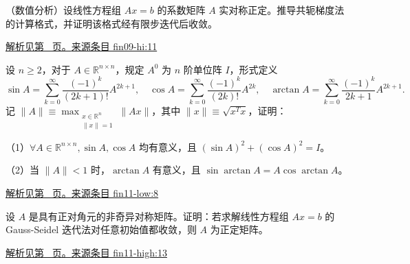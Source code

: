 \documentclass[UTF8,12pt,a4paper,fontset=fandol]{ctexart}
\begin{document}
\begin{example}\label{ex:fin09-hi:11}

（数值分析）设线性方程组 $Ax=b$ 的系数矩阵 $A$ 实对称正定。推导共轭梯度法的计算格式，并证明该格式经有限步迭代后收敛。

\par\hyperref[ans:fin09-hi:11]{解析见第~\pageref{ans:fin09-hi:11} 页。}\quad\href{https://github.com/lzxcr/cmc-mathematics/blob/64916fa1fdbc3e444a652eca204d5669058ee321/src/problems/finals/09/13.md}{来源条目 fin09-hi:11}

\end{example}

\begin{example}\label{ex:fin11-low:8}

设 $n\geq 2$，对于 $A\in\mathbb{R}^{n\times n}$，规定 $A^{0}$ 为 $n$ 阶单位阵 $I$，形式定义
\[
\sin A=\sum_{k=0}^{\infty}\frac{(-1)^{k}}{(2k+1)!}A^{2k+1}, \quad \cos A=\sum_{k=0}^{\infty}\frac{(-1)^{k}}{(2k)!}A^{2k}, \quad \arctan A=\sum_{k=0}^{\infty}\frac{(-1)^{k}}{2k+1}A^{2k+1}.
\]
记 $\|A\| \equiv \max_{\substack{x\in\mathbb{R}^{n}\\ \|x\|=1}} \|Ax\|$，其中 $\|x\| \equiv \sqrt{x^{T}x}$，证明：

（1）$\forall A\in\mathbb{R}^{n\times n}, \sin A,\cos A$ 均有意义，且 $(\sin A)^{2}+(\cos A)^{2}=I$。

（2）当 $\|A\|<1$ 时，$\arctan A$ 有意义，且 $\sin \arctan A=A\cos \arctan A$。

\par\hyperref[ans:fin11-low:8]{解析见第~\pageref{ans:fin11-low:8} 页。}\quad\href{https://github.com/lzxcr/cmc-mathematics/blob/64916fa1fdbc3e444a652eca204d5669058ee321/src/problems/finals/11/08.md}{来源条目 fin11-low:8}

\end{example}

\begin{example}\label{ex:fin11-high:13}

设 $A$ 是具有正对角元的非奇异对称矩阵。证明：若求解线性方程组 $Ax=b$ 的 Gauss-Seidel 迭代法对任意初始值都收敛，则 $A$ 为正定矩阵。

\par\hyperref[ans:fin11-high:13]{解析见第~\pageref{ans:fin11-high:13} 页。}\quad\href{https://github.com/lzxcr/cmc-mathematics/blob/64916fa1fdbc3e444a652eca204d5669058ee321/src/problems/finals/11/15.md}{来源条目 fin11-high:13}

\end{example}
\end{document}
